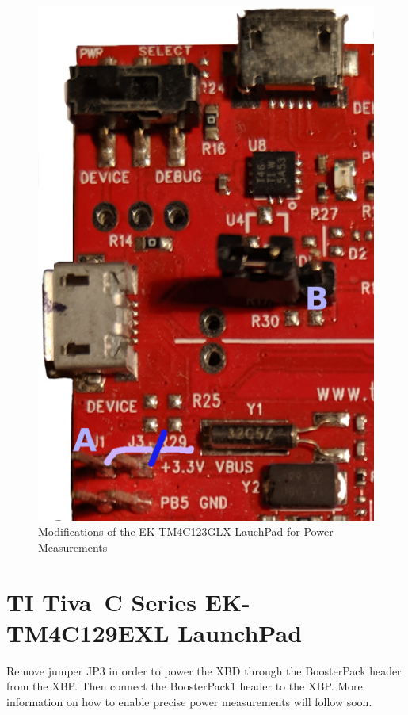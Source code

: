 \documentclass[twoside,11pt]{cergdoc}
\begin{document}
\begin{figure}[ht]
  \begin{center}
    \includegraphics[scale=0.3]{figures/ek-tm4c123gxl-power}
    \caption{Modifications of the EK-TM4C123GLX LauchPad for Power Measurements}\label{fig:tm4c123-power}
  \end{center}
\end{figure}


  \section{TI Tiva\texttrademark~C Series EK-TM4C129EXL LaunchPad}
Remove jumper JP3 in order to power the XBD through the BoosterPack header from the XBP.
Then connect the BoosterPack1 header to the XBP. More information on how to enable precise power measurements
will follow soon.
\end{document}
